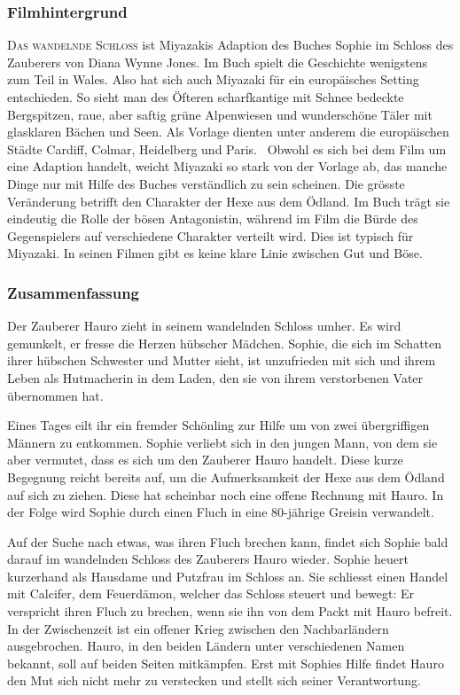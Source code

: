 \subsubsection{Filmhintergrund} 
\textsc{Das wandelnde Schloss} ist Miyazakis Adaption des Buches \glqq Sophie im Schloss des Zauberers \grqq von Diana Wynne Jones. Im Buch spielt die Geschichte wenigstens zum Teil in Wales. Also hat sich auch Miyazaki für ein europäisches Setting entschieden. So sieht man des Öfteren scharfkantige mit Schnee bedeckte Bergspitzen, raue, aber saftig grüne Alpenwiesen und wunderschöne Täler mit glasklaren Bächen und Seen. Als Vorlage dienten unter anderem die europäischen Städte Cardiff, Colmar, Heidelberg und Paris.~ Obwohl es sich bei dem Film um eine Adaption handelt, weicht Miyazaki so stark von der Vorlage ab, das manche Dinge nur mit Hilfe des Buches verständlich zu sein scheinen. 
Die grösste Veränderung betrifft den Charakter der Hexe aus dem Ödland. Im Buch trägt sie eindeutig die Rolle der bösen Antagonistin, während im Film die Bürde des Gegenspielers auf verschiedene Charakter verteilt wird. Dies ist typisch für Miyazaki. In seinen Filmen gibt es keine klare Linie zwischen Gut und Böse. 

\subsubsection{Zusammenfassung} 
Der Zauberer Hauro zieht in seinem wandelnden Schloss umher. Es wird gemunkelt, er fresse die Herzen hübscher Mädchen. Sophie, die sich im Schatten ihrer hübschen Schwester und Mutter sieht, ist unzufrieden mit sich und ihrem Leben als Hutmacherin in dem Laden, den sie von ihrem verstorbenen Vater übernommen hat.

Eines Tages eilt ihr ein fremder Schönling zur Hilfe um von zwei übergriffigen Männern zu entkommen. Sophie verliebt sich in den jungen Mann, von dem sie aber vermutet, dass es sich um den Zauberer Hauro handelt. Diese kurze Begegnung reicht bereits auf, um die Aufmerksamkeit der Hexe aus dem Ödland auf sich zu ziehen. Diese hat scheinbar noch eine offene Rechnung mit Hauro. In der Folge wird Sophie durch einen Fluch in eine 80-jährige Greisin verwandelt. 

Auf der Suche nach etwas, was ihren Fluch brechen kann, findet sich Sophie bald darauf im wandelnden Schloss des Zauberers Hauro wieder. Sophie heuert kurzerhand als Hausdame und Putzfrau im Schloss an. Sie schliesst einen Handel mit Calcifer, dem Feuerdämon, welcher das Schloss steuert und bewegt: Er verspricht ihren Fluch zu brechen, wenn sie ihn von dem Packt mit Hauro befreit. In der Zwischenzeit ist ein offener Krieg zwischen den Nachbarländern ausgebrochen. Hauro, in den beiden Ländern unter verschiedenen Namen bekannt, soll auf beiden Seiten mitkämpfen. Erst mit Sophies Hilfe findet Hauro den Mut sich nicht mehr zu verstecken und stellt sich seiner Verantwortung. 

